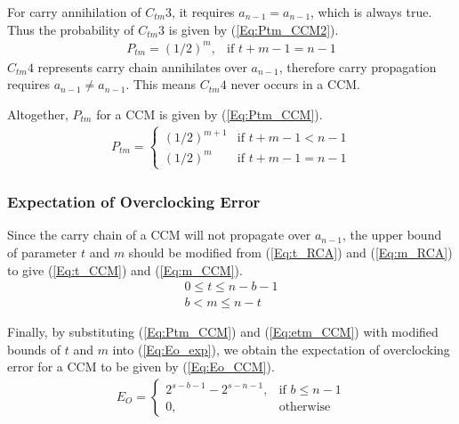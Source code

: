 \documentclass[prodmode,acmtrets]{acmsmall} %
\begin{document}
For carry annihilation of $C_{tm}3$, it requires $a_{n-1}=a_{n-1}$, which is always true. Thus the probability of $C_{tm}3$ is given by (\ref{Eq:Ptm_CCM2}).
%
\begin{eqnarray}\label{Eq:Ptm_CCM2}
  P_{tm}=\left(1/2\right)^m, & \textrm{if $t+m-1=n-1$}
\end{eqnarray}
$C_{tm}4$ represents carry chain annihilates over $a_{n-1}$, therefore carry propagation requires $a_{n-1}\neq a_{n-1}$. This means $C_{tm}4$ never occurs in a CCM.

Altogether, $P_{tm}$ for a CCM is given by (\ref{Eq:Ptm_CCM}).
%
\begin{eqnarray}\label{Eq:Ptm_CCM}
  P_{tm}=\left\{\begin{array}{ll}
      (1/2)^{m+1} & \textrm{if $t+m-1<n-1$}\\
      (1/2)^{m} & \textrm{if $t+m-1=n-1$}
    \end{array} \right.
\end{eqnarray}

\subsubsection{Expectation of Overclocking Error}
Since the carry chain of a CCM will not propagate over $a_{n-1}$, the upper bound of parameter $t$ and $m$ should be modified from (\ref{Eq:t_RCA}) and (\ref{Eq:m_RCA}) to give (\ref{Eq:t_CCM}) and (\ref{Eq:m_CCM}).
%
\begin{eqnarray}
  \label{Eq:t_CCM} 0\leqslant t\leqslant n-b-1\\
  \label{Eq:m_CCM} b<m\leqslant n-t
\end{eqnarray}

Finally, by substituting (\ref{Eq:Ptm_CCM}) and (\ref{Eq:etm_CCM}) with modified bounds of $t$ and $m$ into (\ref{Eq:Eo_exp}), we obtain the expectation of overclocking error for a CCM to be given by (\ref{Eq:Eo_CCM}).
%
\begin{eqnarray}\label{Eq:Eo_CCM}
      E_O=\left\{
        \begin{matrix}
            2^{s-b-1}-2^{s-n-1}, & \textrm{if $b\leq n-1$}\\
            0, & \textrm{otherwise}
        \end{matrix}
      \right.
\end{eqnarray}
\end{document}
